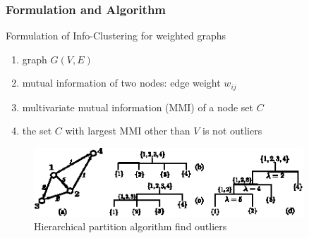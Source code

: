 \documentclass[notheorems]{beamer}
\begin{document}

\begin{frame}
\frametitle{Formulation and Algorithm}
Formulation of Info-Clustering for weighted graphs
\begin{enumerate}
\item graph $G(V, E)$
\item mutual information of two nodes: edge weight $w_{ij}$
\item multivariate mutual information (MMI) of a node set $C$
\item the set $C$ with largest MMI other than $V$ is not outliers
\end{enumerate}
\begin{figure}
	\includegraphics[width=0.9\textwidth]{alg_illustration.eps}
	\caption{Hierarchical partition algorithm find outliers}
\end{figure}
\end{frame}
\end{document}
